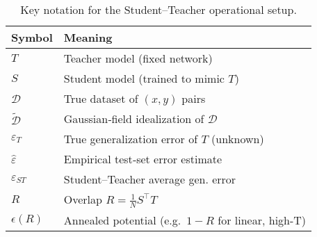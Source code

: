 \begin{table}[h]
\centering
\begin{tabular}{@{}ll@{}}
\toprule
\textbf{Symbol} & \textbf{Meaning} \\
\midrule
$T$                      & Teacher model (fixed network) \\
$S$                      & Student model (trained to mimic $T$) \\
$\mathcal D$             & True dataset of $(x,y)$ pairs \\
$\widetilde{\mathcal D}$ & Gaussian‐field idealization of $\mathcal D$ \\
$\varepsilon_T$          & True generalization error of $T$ (unknown) \\
$\widehat\varepsilon$    & Empirical test‐set error estimate \\
$\varepsilon_{ST}$       & Student–Teacher average gen. error \\
$R$                      & Overlap $\displaystyle R=\tfrac{1}{N}S^\top T$ \\
$\epsilon(R)$            & Annealed potential (e.g.\ $1-R$ for linear, high-T) \\
\bottomrule
\end{tabular}
\caption{Key notation for the Student–Teacher operational setup.}
\label{tab:st_notation}
\end{table}
